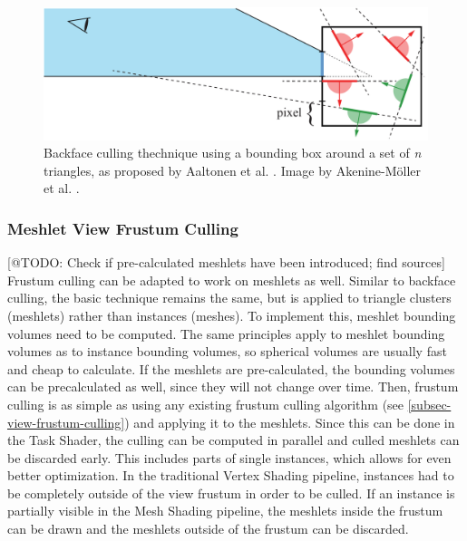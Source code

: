 \begin{figure}[h]
    \centering
    \includegraphics[width=\linewidth]{images/graphics/backface-culling-ac-unity.png}
    \caption{Backface culling thechnique using a bounding box around a set of \emph{n} triangles, 
    as proposed by Aaltonen et al. \cite{Aaltonen2015}. Image by Akenine-Möller et al. \cite{AkenineMoeller2018}.}
    \label{fig:backface-culling-ac-unity}
\end{figure}


\subsubsection{Meshlet View Frustum Culling} \label{subsubsec-meshlet-view-frustum-culling}

[@TODO: Check if pre-calculated meshlets have been introduced; find sources]
Frustum culling can be adapted to work on meshlets as well. Similar to backface culling, the basic technique remains 
the same, but is applied to triangle clusters (meshlets) rather than instances (meshes). To implement this, meshlet 
bounding volumes need to be computed. The same principles apply to meshlet bounding volumes as to instance bounding 
volumes, so spherical volumes are usually fast and cheap to calculate. If the meshlets are pre-calculated, the 
bounding volumes can be precalculated as well, since they will not change over time. Then, frustum culling is as simple 
as using any existing frustum culling algorithm (see \ref{subsec-view-frustum-culling}) and applying it to the meshlets.
Since this can be done in the Task Shader, the culling can be computed in parallel and culled meshlets can be discarded 
early. This includes parts of single instances, which allows for even better optimization. In the traditional Vertex 
Shading pipeline, instances had to be completely outside of the view frustum in order to be culled. If an instance is 
partially visible in the Mesh Shading pipeline, the meshlets inside the frustum can be drawn and the meshlets outside 
of the frustum can be discarded. \\

